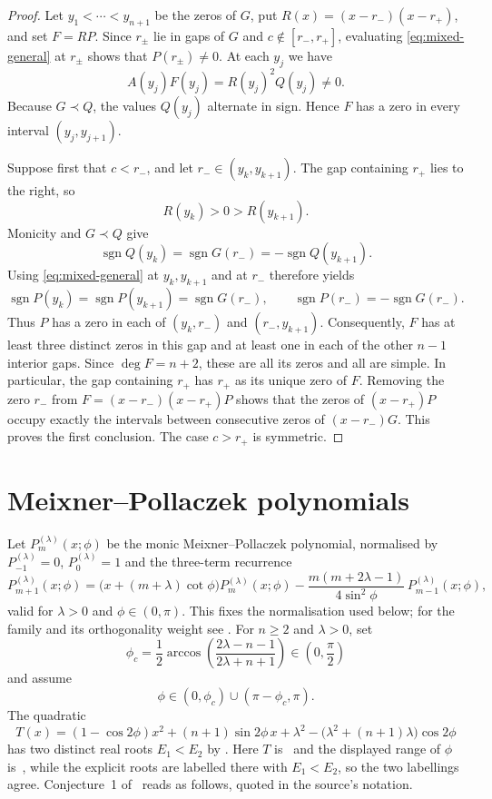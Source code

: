 \documentclass[11pt]{amsart}
\theoremstyle{remark}
\newcommand{\sgn}{\operatorname{sgn}}
\begin{document}
\begin{proof}
Let $y_1<\cdots<y_{n+1}$ be the zeros of $G$, put
$R(x)=(x-r_-)(x-r_+)$, and set $F=RP$.  Since $r_\pm$ lie in gaps of $G$ and
$c\notin[r_-,r_+]$, evaluating \eqref{eq:mixed-general} at $r_\pm$ shows that
$P(r_\pm)\ne0$.  At each $y_j$ we have
\begin{equation}\label{eq:Fsign}
 A(y_j)F(y_j)=R(y_j)^2Q(y_j)\ne0.
\end{equation}
Because $G\prec Q$, the values $Q(y_j)$ alternate in sign.  Hence $F$ has a
zero in every interval $(y_j,y_{j+1})$.

Suppose first that $c<r_-$, and let $r_-\in(y_k,y_{k+1})$.  The gap containing
$r_+$ lies to the right, so
\[
 R(y_k)>0>R(y_{k+1}).
\]
Monicity and $G\prec Q$ give
\[
 \sgn Q(y_k)=\sgn G(r_-)=-\sgn Q(y_{k+1}).
\]
Using \eqref{eq:mixed-general} at $y_k,y_{k+1}$ and at $r_-$ therefore yields
\[
 \sgn P(y_k)=\sgn P(y_{k+1})=\sgn G(r_-),
 \qquad
 \sgn P(r_-)=-\sgn G(r_-).
\]
Thus $P$ has a zero in each of $(y_k,r_-)$ and $(r_-,y_{k+1})$.  Consequently,
$F$ has at least three distinct zeros in this gap and at least one in each of
the other $n-1$ interior gaps.  Since $\deg F=n+2$, these are all its zeros and
all are simple.  In particular, the gap containing $r_+$ has $r_+$ as its
unique zero of $F$.  Removing the zero $r_-$ from $F=(x-r_-)(x-r_+)P$ shows
that the zeros of $(x-r_+)P$ occupy exactly the intervals between consecutive
zeros of $(x-r_-)G$.  This proves the first conclusion.  The case $c>r_+$ is
symmetric.
\end{proof}

\section{Meixner--Pollaczek polynomials}

Let $P_m^{(\lambda)}(x;\phi)$ be the monic Meixner--Pollaczek polynomial,
normalised by $P_{-1}^{(\lambda)}=0$, $P_0^{(\lambda)}=1$ and the
three-term recurrence
\begin{equation}\label{eq:MPrec}
 P_{m+1}^{(\lambda)}(x;\phi)
 =\bigl(x+(m+\lambda)\cot\phi\bigr)P_m^{(\lambda)}(x;\phi)
 -\frac{m(m+2\lambda-1)}{4\sin^2\phi}\,P_{m-1}^{(\lambda)}(x;\phi),
\end{equation}
valid for $\lambda>0$ and $\phi\in(0,\pi)$.  This fixes the normalisation used
below; for the family and its orthogonality weight see
\cite[\href{https://dlmf.nist.gov/18.19}{\S18.19}]{DLMF}.
For $n\ge2$ and $\lambda>0$, set
\[
 \phi_c=\frac12\arccos\!\left(\frac{2\lambda-n-1}{2\lambda+n+1}\right)
 \in\left(0,\frac\pi2\right)
\]
and assume
\[
 \phi\in(0,\phi_c)\cup(\pi-\phi_c,\pi).
\]
The quadratic
\begin{equation}\label{eq:T}
 T(x)=(1-\cos2\phi)x^2+(n+1)\sin2\phi\,x
 +\lambda^2-\bigl(\lambda^2+(n+1)\lambda\bigr)\cos2\phi
\end{equation}
has two distinct real roots $E_1<E_2$ by
\cite[Lemma~5.1]{JordaanKumar}.  Here $T$ is~\cite[(5.3)]{JordaanKumar} and the
displayed range of $\phi$ is~\cite[(5.4)]{JordaanKumar}, while the explicit
roots \cite[(5.7)--(5.8)]{JordaanKumar} are labelled there with $E_1<E_2$, so
the two labellings agree.  Conjecture~1 of~\cite{JordaanKumar} reads as
follows, quoted in the source's notation.
\end{document}
